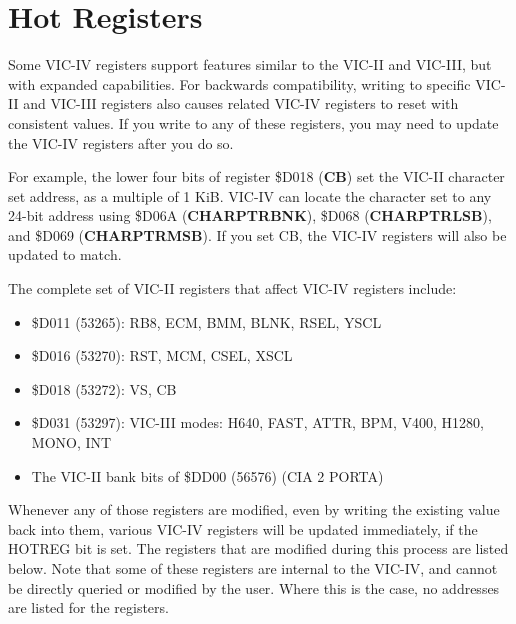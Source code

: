 \section{Hot Registers}

Some VIC-IV registers support features similar to the VIC-II and VIC-III, but with expanded capabilities. For backwards compatibility, writing to specific VIC-II and VIC-III registers also causes related VIC-IV registers to reset with consistent values. If you write to any of these registers, you may need to update the VIC-IV registers after you do so.

For example, the lower four bits of register \$D018 (\textbf{CB}) set the VIC-II character set address, as a multiple of 1 KiB. VIC-IV can locate the character set to any 24-bit address using \$D06A (\textbf{CHARPTRBNK}), \$D068 (\textbf{CHARPTRLSB}), and \$D069 (\textbf{CHARPTRMSB}). If you set CB, the VIC-IV registers will also be updated to match.

The complete set of VIC-II registers that affect VIC-IV registers include:

\begin{itemize}
\item \$D011 (53265): RB8, ECM, BMM, BLNK, RSEL, YSCL
\item \$D016 (53270): RST, MCM, CSEL, XSCL
\item \$D018 (53272): VS, CB
\item \$D031 (53297): VIC-III modes: H640, FAST, ATTR, BPM, V400, H1280, MONO, INT
\item The VIC-II bank bits of \$DD00 (56576) (CIA 2 PORTA)
\end{itemize}

Whenever any of those registers are modified, even by writing the existing value back into them, various VIC-IV registers will be updated immediately, if the HOTREG bit is set.  The registers that are modified during this process are listed below. Note that some of these registers are internal to the VIC-IV, and cannot be directly queried or modified by the user.  Where this is the case, no addresses are listed for the registers.


